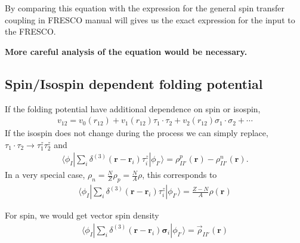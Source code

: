 \documentclass[11pt]{book}
\def\bm{\boldsymbol}
\def\vr{{\bm r}}
\def\la{\langle}
\def\ra{\rangle}
\newcommand{\bea}{\begin{eqnarray}}
\newcommand{\eea}{\end{eqnarray}}
\begin{document}
By comparing this equation with the expression for the general spin transfer coupling in FRESCO manual
will gives us the exact expression for the input to the FRESCO. 

{\bf More careful analysis of the equation would be necessary.}

\subsection{Spin/Isospin dependent folding potential}
If the folding potential have additional dependence on spin or isospin,
\bea 
v_{12}=v_0(r_{12})+v_1(r_{12})\tau_1\cdot\tau_2+v_2(r_{12})\sigma_1\cdot\sigma_2+\cdots 
\eea  
If the isospin does not change during the process we can simply replace, 
$\tau_1\cdot\tau_2\to \tau_1^z \tau_2^z$ and 
\bea 
\la \phi_{I}|\sum_{i}  \delta^{(3)}(\vr-\vr_i)\tau_i^z |\phi_{I'}\ra
= \rho^p_{II'}(\vr)-\rho^n_{II'}(\vr).
\eea  
In a very special case, $\rho_n=\frac{N}{Z}\rho_p=\frac{N}{A}\rho$, this corresponds to 
\bea 
\la \phi_{I}|\sum_{i}  \delta^{(3)}(\vr-\vr_i)\tau_i^z |\phi_{I'}\ra =\frac{Z-N}{A}\rho(\vr)
\eea 


For spin, we would get vector spin density 
\bea 
\la \phi_{I}|\sum_{i}  \delta^{(3)}(\vr-\vr_i){\bm \sigma}_i|\phi_{I'}\ra
={\vec \rho}_{II'}(\vr)
\eea 
\end{document}
